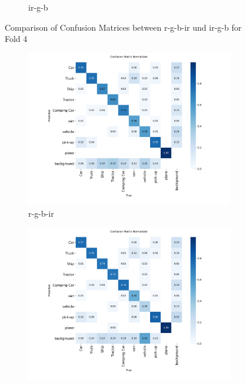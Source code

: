 \begin{figure}[h]
\begin{subfigure}[b]{0.85\textwidth}
        \caption{ir-g-b} %
        \label{fig:cm_irgb} %
    \end{subfigure}
    \caption{Comparison of Confusion Matrices between r-g-b-ir und ir-g-b for Fold 4} %
    \label{fig:combined_maps} %
\end{figure}

\begin{figure}[h] 
    \centering
    \begin{subfigure}[b]{0.85\textwidth} %
        \includegraphics[width=\textwidth]{images/confusion_matrices/rgbir_F4_confusion_matrix_normalized.png} %
        \caption{r-g-b-ir} %
        \label{fig:cm_trgbir} %
    \end{subfigure}
    \hfill %
    \begin{subfigure}[b]{0.85\textwidth} %
        \includegraphics[width=\textwidth]{images/confusion_matrices/irgb_F4_confusion_matrix_normalized.png} %

\end{subfigure}
\end{figure}

